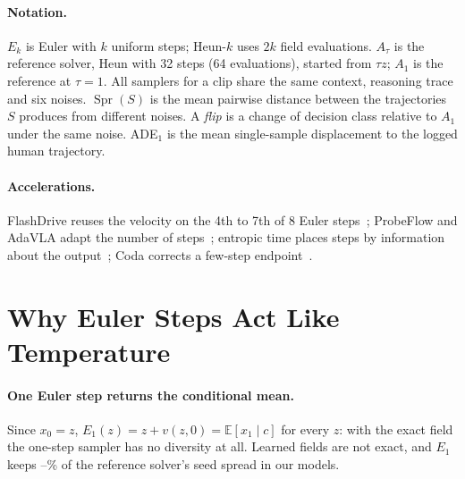 \documentclass{article}
\theoremstyle{plain}
\theoremstyle{definition}
\theoremstyle{remark}
\newcommand{\Aref}{A_{1}}
\newcommand{\Atau}{A_{\tau}}
\newcommand{\Spr}{\operatorname{Spr}}
\newcommand{\E}{\mathbb{E}}
\begin{document}
\paragraph{Notation.} $E_k$ is Euler with $k$ uniform steps; Heun-$k$ uses $2k$ field evaluations. $\Atau$ is the reference solver, Heun with 32 steps (64 evaluations), started from $\tau z$; $\Aref$ is the reference at $\tau=1$. All samplers for a clip share the same context, reasoning trace and six noises. $\Spr(S)$ is the mean pairwise distance between the trajectories $S$ produces from different noises. A \emph{flip} is a change of decision class relative to $\Aref$ under the same noise. ADE$_1$ is the mean single-sample displacement to the logged human trajectory.

\paragraph{Accelerations.} FlashDrive reuses the velocity on the 4th to 7th of 8 Euler steps~\citep{flashdrive2026}; ProbeFlow and AdaVLA adapt the number of steps~\citep{probeflow2026,adavla2026}; entropic time places steps by information about the output~\citep{stancevic2025entropic}; Coda corrects a few-step endpoint~\citep{coda2026}.

\section{Why Euler Steps Act Like Temperature}
\label{sec:theory}

\paragraph{One Euler step returns the conditional mean.} Since $x_0=z$, $E_1(z)=z+v(z,0)=\E[x_1\mid c]$ for every $z$: with the exact field the one-step sampler has no diversity at all. Learned fields are not exact, and $E_1$ keeps \EOneSpreadMin--\EOneSpreadMax\% of the reference solver's seed spread in our models.
\end{document}
